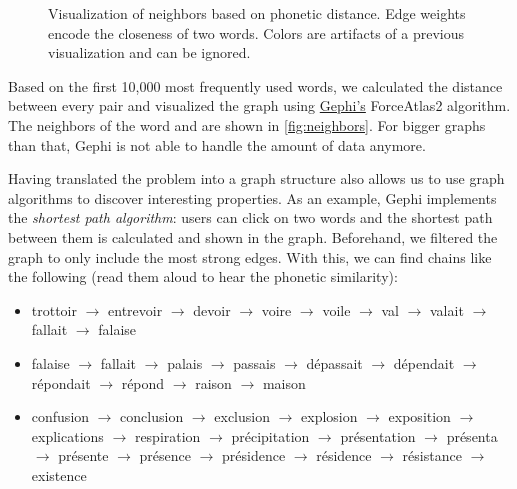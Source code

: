 \begin{figure}[ht]
    \centering
    \hfill
    \caption{Visualization of neighbors based on phonetic distance. Edge weights encode the closeness of two words. Colors are artifacts of a previous visualization and can be ignored.}
    \label{fig:neighbors}
\end{figure}

\begin{multicols*}{2}


Based on the first 10,000 most frequently used words, we calculated the distance between every pair and visualized the graph using \href{https://gephi.org/}{Gephi's} ForceAtlas2 algorithm. The neighbors of the word  and  are shown in \autoref{fig:neighbors}. For bigger graphs than that, Gephi is not able to handle the amount of data anymore.

Having translated the problem into a graph structure also allows us to use graph algorithms to discover interesting properties. As an example, Gephi implements the \textit{shortest path algorithm}: users can click on two words and the shortest path between them is calculated and shown in the graph. Beforehand, we filtered the graph to only include the most strong edges. With this, we can find chains like the following (read them aloud to hear the phonetic similarity):
\begin{itemize}
    \item trottoir $\rightarrow$ entrevoir $\rightarrow$ devoir $\rightarrow$ voire $\rightarrow$ voile $\rightarrow$ val $\rightarrow$ valait $\rightarrow$ fallait $\rightarrow$ falaise
    \item falaise $\rightarrow$ fallait $\rightarrow$ palais $\rightarrow$ passais $\rightarrow$ dépassait $\rightarrow$ dépendait $\rightarrow$ répondait $\rightarrow$ répond $\rightarrow$ raison $\rightarrow$ maison
    \item confusion $\rightarrow$ conclusion $\rightarrow$ exclusion $\rightarrow$ explosion $\rightarrow$ exposition $\rightarrow$ explications $\rightarrow$ respiration $\rightarrow$ précipitation $\rightarrow$ présentation $\rightarrow$ présenta $\rightarrow$ présente $\rightarrow$ présence $\rightarrow$ présidence $\rightarrow$ résidence $\rightarrow$ résistance $\rightarrow$ existence
\end{itemize}

\printglossary[type=\acronymtype]

\end{multicols*}

